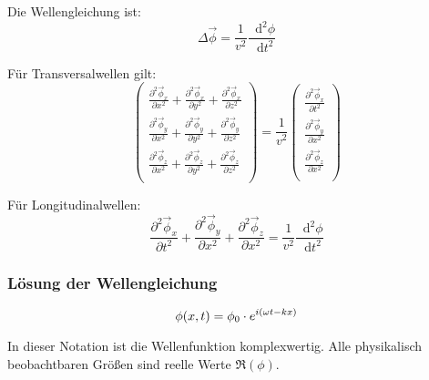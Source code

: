 \documentclass[a4paper,12pt]{report}
\newcommand*\diff{\mathop{}\!\mathrm{d}}
\begin{document}
Die Wellengleichung ist: \\

\begin{equation}
\Delta \vec{\phi} = \frac{1}{v^2} \frac{\diff^2 \phi}{\diff t^2}
\end{equation}

Für Transversalwellen gilt: \\

\begin{equation}
\begin{pmatrix}
\frac{\partial^2 \vec{\phi}_x}{\partial x^2} + \frac{\partial^2 \vec{\phi}_x}{\partial y^2} + \frac{\partial^2 \vec{\phi}_x}{\partial z^2} \\
\frac{\partial^2 \vec{\phi}_y}{\partial x^2} + \frac{\partial^2 \vec{\phi}_y}{\partial y^2} + \frac{\partial^2 \vec{\phi}_y}{\partial z^2} \\
\frac{\partial^2 \vec{\phi}_z}{\partial x^2} + \frac{\partial^2 \vec{\phi}_z}{\partial y^2} + \frac{\partial^2 \vec{\phi}_z}{\partial z^2} \\
\end{pmatrix} = \frac{1}{v^2}
\begin{pmatrix}
\frac{\partial^2 \vec{\phi}_x}{\partial t^2}\\
\frac{\partial^2 \vec{\phi}_y}{\partial x^2}\\
\frac{\partial^2 \vec{\phi}_z}{\partial x^2}\\
\end{pmatrix} 
\end{equation}

Für Longitudinalwellen: \\

\begin{equation}
\frac{\partial^2 \vec{\phi}_x}{\partial t^2} +
\frac{\partial^2 \vec{\phi}_y}{\partial x^2} +
\frac{\partial^2 \vec{\phi}_z}{\partial x^2} =
\frac{1}{v^2} \frac{\diff^2 \phi}{\diff t^2}
\end{equation}

\subsubsection{Lösung der Wellengleichung}

\begin{equation}
\phi(x,t) = \phi_0 \cdot e^{i(\omega t - k x)} \\
\end{equation}

In dieser Notation ist die Wellenfunktion komplexwertig. Alle physikalisch beobachtbaren Größen sind reelle Werte $\Re(\phi)$. \\
\end{document}

